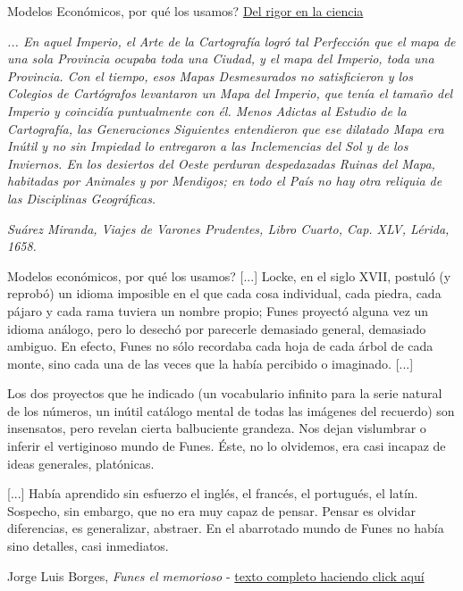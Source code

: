 \documentclass{beamer}
\begin{document}
\begin{frame}{Modelos Económicos, por qu\'e los usamos?}
    \center\underline{{Del rigor en la ciencia}}
    \bigskip
    
    \small{\textit{... En aquel Imperio, el Arte de la Cartografía logró tal Perfección que el mapa de una sola Provincia ocupaba toda una Ciudad, y el mapa del Imperio, toda una Provincia. Con el tiempo, esos Mapas Desmesurados no satisficieron y los Colegios de Cartógrafos levantaron un Mapa del Imperio, que tenía el tamaño del Imperio y coincidía puntualmente con él. Menos Adictas al Estudio de la Cartografía, las Generaciones Siguientes entendieron que ese dilatado Mapa era Inútil y no sin Impiedad lo entregaron a las Inclemencias del Sol y de los Inviernos. En los desiertos del Oeste perduran despedazadas Ruinas del Mapa, habitadas por Animales y por Mendigos; en todo el País no hay otra reliquia de las Disciplinas Geográficas.}}
    
    \bigskip
    
    \small\textit{{Suárez Miranda, Viajes de Varones Prudentes, Libro Cuarto, Cap. XLV, Lérida, 1658.}}
\end{frame}

\begin{frame}{Modelos econ\'omicos, por qu\'e los usamos?}
\small
[...] Locke, en el siglo XVII, postuló (y reprobó) un idioma imposible en el que cada cosa individual, cada piedra, cada pájaro y cada rama tuviera un nombre propio; Funes proyectó alguna vez un idioma análogo, pero lo desechó por parecerle demasiado general, demasiado ambiguo. En efecto, Funes no sólo recordaba cada hoja de cada árbol de cada monte, sino cada una de las veces que la había percibido o imaginado. [...] %

Los dos proyectos que he indicado (un vocabulario infinito para la serie natural de los números, un inútil catálogo mental de todas las imágenes del recuerdo) son insensatos, pero revelan cierta balbuciente grandeza. Nos dejan vislumbrar o inferir el vertiginoso mundo de Funes. Éste, no lo olvidemos, era casi incapaz de ideas generales, platónicas. %

[...] Había aprendido sin esfuerzo el inglés, el francés, el portugués, el latín. Sospecho, sin embargo, que no era muy capaz de pensar. Pensar es olvidar diferencias, es generalizar, abstraer. En el abarrotado mundo de Funes no había sino detalles, casi inmediatos. %

Jorge Luis Borges, \textit{Funes el memorioso} - \href{https://www.ingenieria.unam.mx/dcsyhfi/material_didactico/Literatura_Hispanoamericana_Contemporanea/Autores_B/BORGES/memorioso.pdf}{texto completo haciendo click aqu\'i}
\end{frame}
\end{document}
